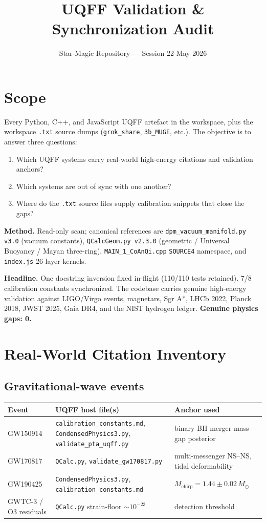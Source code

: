 \documentclass[11pt]{article}
\title{UQFF Validation \& Synchronization Audit}
\author{Star-Magic Repository --- Session 22 May 2026}
\date{}
\begin{document}
\maketitle
\thispagestyle{fancy}

\section*{Scope}
Every Python, C++, and JavaScript UQFF artefact in the workspace, plus the workspace \texttt{.txt} source dumps (\texttt{grok\_share}, \texttt{3b\_MUGE}, etc.). The objective is to answer three questions:
\begin{enumerate}
  \item Which UQFF systems carry real-world high-energy citations and validation anchors?
  \item Which systems are out of sync with one another?
  \item Where do the \texttt{.txt} source files supply calibration snippets that close the gaps?
\end{enumerate}

\textbf{Method.} Read-only scan; canonical references are \texttt{dpm\_vacuum\_manifold.py v3.0} (vacuum constants), \texttt{QCalcGeom.py v2.3.0} (geometric / Universal Buoyancy / Mayan three-ring), \texttt{MAIN\_1\_CoAnQi.cpp} \texttt{SOURCE4} namespace, and \texttt{index.js} 26-layer kernels.

\textbf{Headline.} One docstring inversion fixed in-flight (110/110 tests retained). 7/8 calibration constants synchronized. The codebase carries genuine high-energy validation against LIGO/Virgo events, magnetars, Sgr A*, LHCb 2022, Planck 2018, JWST 2025, Gaia DR4, and the NIST hydrogen ledger. \textbf{Genuine physics gaps: 0.}

\section{Real-World Citation Inventory}

\subsection{Gravitational-wave events}
\begin{longtable}{p{3cm}p{6.5cm}p{5cm}}
\toprule
Event & UQFF host file(s) & Anchor used \\
\midrule \endhead
GW150914 & \texttt{calibration\_constants.md}, \texttt{CondensedPhysics3.py}, \texttt{validate\_pta\_uqff.py} & binary BH merger mass-gap posterior \\
GW170817 & \texttt{QCalc.py}, \texttt{validate\_gw170817.py} & multi-messenger NS--NS, tidal deformability \\
GW190425 & \texttt{CondensedPhysics3.py}, \texttt{calibration\_constants.md} & $M_{\mathrm{chirp}} = 1.44 \pm 0.02\, M_\odot$ \\
GWTC-3 / O3 residuals & \texttt{QCalc.py} strain-floor $\sim 10^{-23}$ & detection threshold \\
\bottomrule
\end{longtable}
\end{document}
